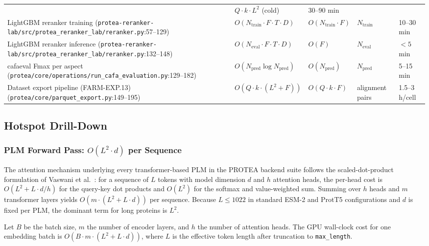 \begin{longtable}{@{}p{3cm}p{3.8cm}p{3.8cm}p{2.2cm}p{2cm}@{}}
  & $Q \cdot k \cdot L^2$ (cold)
  & 30--90 min \\
  LightGBM reranker training
  (\texttt{protea-reranker-lab/src/\allowbreak{}protea\_reranker\_lab/reranker.py}:57--129)
  & $O(N_{\mathrm{train}} \cdot F \cdot T \cdot D)$
  & $O(N_{\mathrm{train}} \cdot F)$
  & $N_{\mathrm{train}}$
  & 10--30 min \\
  LightGBM reranker inference
  (\texttt{protea-reranker-lab/src/\allowbreak{}protea\_reranker\_lab/reranker.py}:132--148)
  & $O(N_{\mathrm{eval}} \cdot F \cdot T \cdot D)$
  & $O(F)$
  & $N_{\mathrm{eval}}$
  & $<5$ min \\
  cafaeval Fmax per aspect
  (\texttt{protea/core/operations/run\_cafa\_evaluation.py}:129--182)
  & $O(N_{\mathrm{pred}} \log N_{\mathrm{pred}})$
  & $O(N_{\mathrm{pred}})$
  & $N_{\mathrm{pred}}$
  & 5--15 min \\
  Dataset export pipeline (FARM-EXP.13)
  (\texttt{protea/core/parquet\_export.py}:149--195)
  & $O(Q \cdot k \cdot (L^2 + F))$
  & $O(Q \cdot k \cdot F)$
  & alignment pairs
  & 1.5--3 h/cell \\
\end{longtable}

\subsection{Hotspot Drill-Down}
\label{subsec:complexity-hotspots}

\subsubsection{PLM Forward Pass: $O(L^2 \cdot d)$ per Sequence}
\label{sssec:plm-attention}

The attention mechanism underlying every transformer-based PLM in the PROTEA
backend suite follows the scaled-dot-product formulation of Vaswani
et al.~\cite{vaswani2017attention}: for a sequence of $L$ tokens with model
dimension $d$ and $h$ attention heads, the per-head cost is $O(L^2 + L \cdot
d/h)$ for the query-key dot products and $O(L^2)$ for the softmax and
value-weighted sum. Summing over $h$ heads and $m$ transformer layers yields
$O(m \cdot (L^2 + L \cdot d))$ per sequence. Because $L \leq 1022$ in
standard ESM-2 and ProtT5 configurations and $d$ is fixed per PLM,
the dominant term for long proteins is $L^2$.

\begin{definition}
  Let $B$ be the batch size, $m$ the number of encoder layers, and $h$ the
  number of attention heads. The GPU wall-clock cost for one embedding batch
  is $O(B \cdot m \cdot (L^2 + L \cdot d))$, where $L$ is the effective
  token length after truncation to \texttt{max\_length}.
\end{definition}

